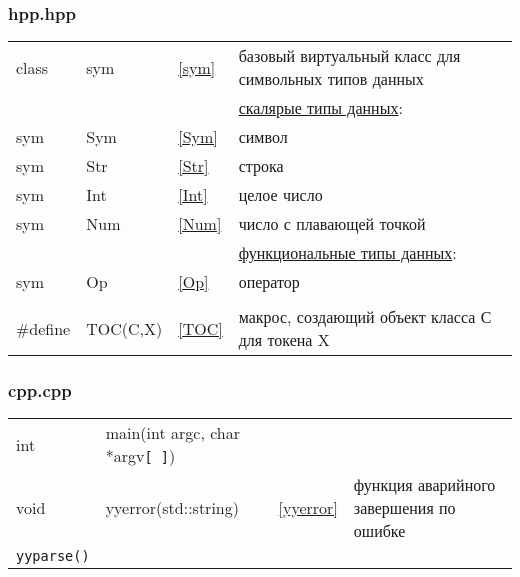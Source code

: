 \subsubsection{hpp.hpp}

\begin{tabular}{l l l l}
class & sym & \ref{sym} &
базовый виртуальный класс для символьных типов данных \\
&&&\underline{скалярые типы данных}:\\
sym & Sym & \ref{Sym} & символ \\
sym & Str & \ref{Str} & строка \\
sym & Int & \ref{Int} & целое число \\
sym & Num & \ref{Num} & число с плавающей точкой \\
&&&\underline{функциональные типы данных}:\\
sym & Op & \ref{Op} & оператор \\
&&&\\
\#define & TOC(C,X) & \ref{TOC} & макрос, создающий объект класса С для токена X \\
\end{tabular}

\subsubsection{cpp.cpp}

\begin{tabular}{l l l l}
int & main(int argc, char *argv\verb|[ ]|) &&\\
void & yyerror(std::string) & \ref{yyerror} &
функция аварийного завершения по ошибке \\
\hline
\verb|yyparse()|\\
\end{tabular}



\secup